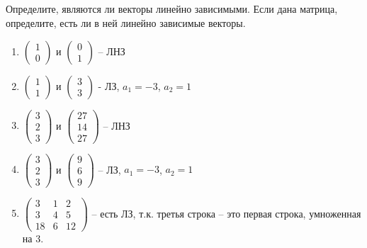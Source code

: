 \documentclass[11pt, a4paper]{extarticle}
\begin{document}
\subsection{}
Определите, являются ли векторы линейно зависимыми. Если дана матрица, определите, есть ли в ней линейно зависимые векторы.
	\begin{enumerate}[label=\alph*)]
		\item $\begin{pmatrix}
		1 \\ 0
		\end{pmatrix}$ и $\begin{pmatrix}
		0 \\ 1
		\end{pmatrix}$ – ЛНЗ
		
		\item $\begin{pmatrix}
		1 \\ 1
		\end{pmatrix}$ и $\begin{pmatrix}
		3 \\ 3
		\end{pmatrix}$ - ЛЗ, $a_1 = -3$, $a_2 = 1$
		
		\item $\begin{pmatrix}
		3 \\ 2 \\ 3
		\end{pmatrix}$ и $\begin{pmatrix}
		27 \\ 14 \\ 27
		\end{pmatrix}$ – ЛНЗ
		
		\item $\begin{pmatrix}
		3 \\ 2 \\ 3
		\end{pmatrix}$ и $\begin{pmatrix}
		9 \\ 6 \\ 9
		\end{pmatrix}$ – ЛЗ, $a_1 = -3$, $a_2 = 1$
		
		\item $\begin{pmatrix}
		3 & 1 & 2 \\
		3 & 4 & 5 \\
		18 & 6 & 12
		\end{pmatrix}$ – есть ЛЗ, т.к. третья строка – это первая строка, умноженная на 3.
		

\end{enumerate}
\end{document}
